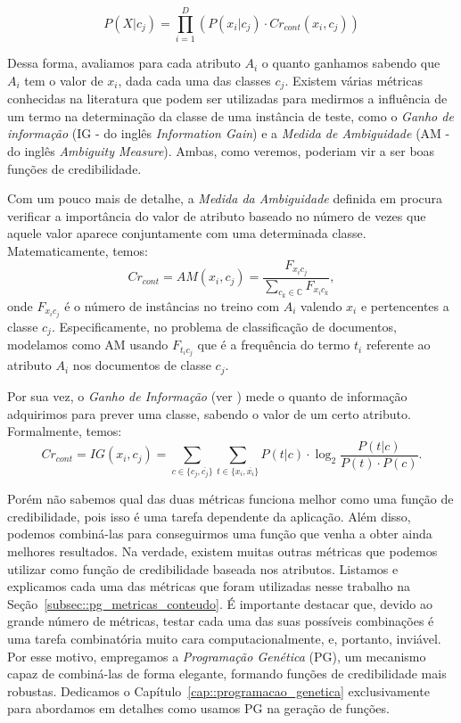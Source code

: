 \begin{equation}\label{eqn::classindependence_conteudo}
   P(X|c_{j}) = \prod^{D}_{i=1}{(P(x_i|c_j) \cdot Cr_{cont}(x_i,c_j))} 
\end{equation}

Dessa forma, avaliamos para cada atributo $A_i$ o quanto ganhamos sabendo que $A_i$ tem o valor de $x_i$, dada cada uma das classes $c_j$. Existem várias métricas conhecidas na literatura que podem ser utilizadas para medirmos a influência de um termo na determinação da classe de uma instância de teste, como o \textit{Ganho de informação} (\textsc{IG} - do inglês \textit{Information Gain}) e a \textit{Medida de Ambiguidade} (\textsc{AM} - do inglês \textit{Ambiguity Measure}). Ambas, como veremos, poderiam vir a ser boas funções de credibilidade. 


    Com um pouco mais de detalhe, a \textit{Medida da Ambiguidade} definida em \cite{Mengle08} procura verificar a importância do valor de atributo baseado no número de vezes que aquele valor aparece conjuntamente com uma determinada classe. Matematicamente, temos:
\begin{equation}\label{eqn::classindependence_conteudo_am}
   Cr_{cont} = AM(x_i, c_j) = \frac{ F_{x_{i}c_{j}}}{\sum\limits_{c_k \in \mathbb{C}} F_{x_{i}c_{k}}},
\end{equation}
   onde $F_{x_{i}c_{j}}$ é o número de instâncias no treino com $A_i$ valendo $x_i$ e pertencentes a classe $c_j$. Especificamente, no problema de classificação de documentos, modelamos como \textsc{AM} usando $F_{t_{i}c_{j}}$ que é a frequência do termo $t_i$ referente ao atributo $A_i$ nos documentos de classe $c_j$.

    Por sua vez, o \textit{Ganho de Informação} (ver \cite{Forman03}) mede o quanto de informação adquirimos para prever uma classe, sabendo o valor de um certo atributo. Formalmente, temos:
\begin{equation}\label{eqn::classindependence_conteudo_ig}
   Cr_{cont} = IG(x_i, c_j) = \sum_{c \in \{c_j, \overline{c_j}\}}\sum_{t \in \{x_i, \overline{x_i}\}}P(t|c) \cdot \log_2\frac{P(t|c)}{P(t) \cdot P(c)}.
\end{equation}

    Porém não sabemos qual das duas métricas funciona melhor como uma função de credibilidade, pois isso é uma tarefa dependente da aplicação. Além disso, podemos combiná-las para conseguirmos uma função que venha a obter ainda melhores resultados. Na verdade, existem muitas outras métricas que podemos utilizar como função de credibilidade baseada nos atributos. Listamos e explicamos cada uma das métricas que foram utilizadas nesse trabalho na Seção~\ref{subsec::pg_metricas_conteudo}. 
É importante destacar que, devido ao grande número de métricas, testar cada uma das suas possíveis combinações é uma tarefa combinatória muito cara computacionalmente, e, portanto, inviável. Por esse motivo, empregamos a \textit{Programação Genética} (\textsc{PG}), um mecanismo capaz de combiná-las de forma elegante, formando funções de credibilidade mais robustas. Dedicamos o Capítulo~\ref{cap::programacao_genetica} exclusivamente para abordamos em detalhes como usamos \textsc{PG} na geração de funções.

